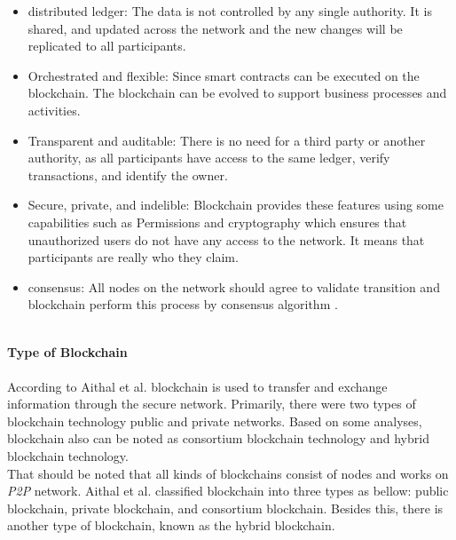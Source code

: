 \begin{itemize}
    \item distributed ledger: The data is not controlled by any single authority. It is shared, and updated across the network and the new changes will be replicated to all participants.
    \item Orchestrated and flexible: Since smart contracts can be executed on the blockchain. The blockchain can be evolved to support business processes and activities.
    \item Transparent and auditable: There is no need for a third party or another authority, as all participants have access to the same ledger, verify transactions, and identify the owner. 
    \item Secure, private, and indelible:
    Blockchain provides these features using some capabilities such as Permissions and cryptography which ensures that  
    unauthorized users do not have any access to the network. It means that participants are really who they claim.
    \item consensus: All nodes on the network should agree to validate transition and blockchain perform this process by consensus algorithm \cite{Gupta}.
\end{itemize}
\\
\textbf{Type of Blockchain} \\
\\
According to Aithal et al.\cite{Aithal} blockchain is used to transfer and exchange information through the secure network. Primarily, there were two types of blockchain technology public and private networks. Based on some analyses, blockchain also can be noted as consortium blockchain technology and hybrid blockchain technology. \\
That should be noted that all kinds of blockchains consist of nodes and works on \textit{P2P} network. Aithal et al.\cite{Aithal} classified blockchain into three types as bellow: public blockchain, private blockchain, and consortium blockchain. Besides this, there is another type of blockchain, known as the hybrid blockchain.
